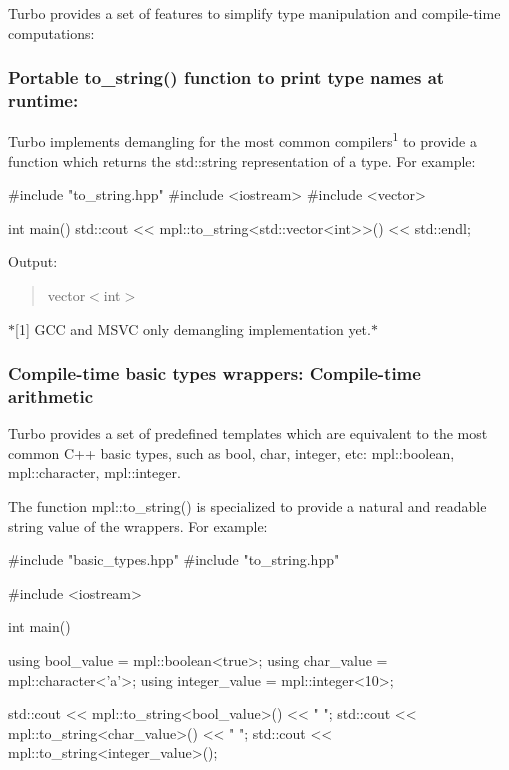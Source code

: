 Turbo provides a set of features to simplify type manipulation and compile-\/time computations\+:

\subsubsection*{Portable {\ttfamily to\+\_\+string()} function to print type names at runtime\+:}

Turbo implements demangling for the most common compilers\textsuperscript{1} to provide a function which returns the {\ttfamily std\+::string} representation of a type. For example\+: \begin{DoxyVerb}#include "to_string.hpp" 
#include <iostream>
#include <vector>

int main()
{
    std::cout << mpl::to_string<std::vector<int>>() << std::endl;
}
\end{DoxyVerb}


Output\+: \begin{quote}
{\ttfamily vector$<$int$>$} \end{quote}


$\ast$\mbox{[}1\mbox{]} G\+C\+C and M\+S\+V\+C only demangling implementation yet.$\ast$

\subsubsection*{Compile-\/time basic types wrappers\+: Compile-\/time arithmetic}

Turbo provides a set of predefined templates which are equivalent to the most common C++ basic types, such as {\ttfamily bool}, {\ttfamily char}, {\ttfamily integer}, etc\+: {\ttfamily mpl\+::boolean}, {\ttfamily mpl\+::character}, {\ttfamily mpl\+::integer}.

The function {\ttfamily mpl\+::to\+\_\+string()} is specialized to provide a natural and readable string value of the wrappers. For example\+: \begin{DoxyVerb}#include "basic_types.hpp"
#include "to_string.hpp"

#include <iostream>

int main()
{
  using bool_value = mpl::boolean<true>;
  using char_value = mpl::character<'a'>;
  using integer_value = mpl::integer<10>;

  std::cout << mpl::to_string<bool_value>() << " ";
  std::cout << mpl::to_string<char_value>() << " ";
  std::cout << mpl::to_string<integer_value>();
}
\end{DoxyVerb}


